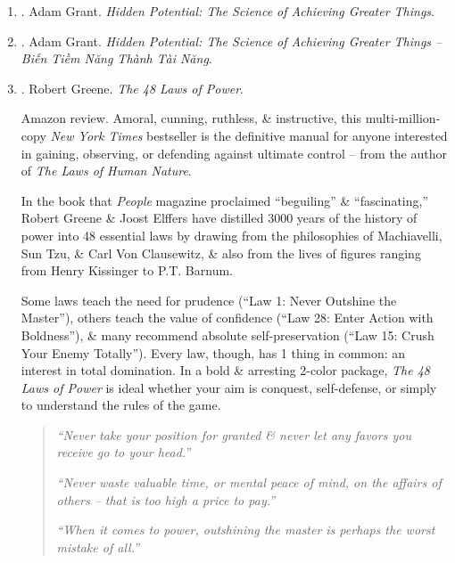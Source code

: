 \documentclass{article}
\begin{document}
\begin{enumerate}
	\item \cite{Grant_hidden_potential}. {\sc Adam Grant}. {\it Hidden Potential: The Science of Achieving Greater Things}.

	\item \cite{Grant_hidden_potential_VN}. {\sc Adam Grant}. {\it Hidden Potential: The Science of Achieving Greater Things  -- Biến Tiềm Năng Thành Tài Năng}.\hfill{\sf[done]}

	\item \cite{Greene_laws_power}. {\sc Robert Greene}. {\it The 48 Laws of Power}. {}

	{\sf Amazon review.} Amoral, cunning, ruthless, \& instructive, this multi-million-copy {\it New York Times} bestseller is the definitive manual for anyone interested in gaining, observing, or defending against ultimate control -- from the author of {\it The Laws of Human Nature}.

	In the book that {\it People} magazine proclaimed ``beguiling'' \& ``fascinating,'' {\sc Robert Greene} \& {\sc Joost Elffers} have distilled 3000 years of the history of power into 48 essential laws by drawing from the philosophies of {\sc Machiavelli, Sun Tzu}, \& {\sc Carl Von Clausewitz}, \& also from the lives of figures ranging from {\sc Henry Kissinger} to {\sc P.T. Barnum}.

	Some laws teach the need for prudence (``Law 1: Never Outshine the Master''), others teach the value of confidence (``Law 28: Enter Action with Boldness''), \& many recommend absolute self-preservation (``Law 15: Crush Your Enemy Totally''). Every law, though, has 1 thing in common: an interest in total domination. In a bold \& arresting 2-color package, {\it The 48 Laws of Power} is ideal whether your aim is conquest, self-defense, or simply to understand the rules of the game.
	\begin{quotation}
		{\it``Never take your position for granted \& never let any favors you receive go to your head.''}

		{\it``Never waste valuable time, or mental peace of mind, on the affairs of others -- that is too high a price to pay.''}

		{\it``When it comes to power, outshining the master is perhaps the worst mistake of all.''}


\end{quotation}
\end{enumerate}
\end{document}

